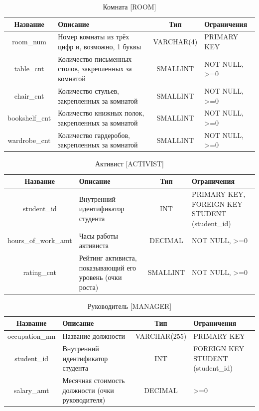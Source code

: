 \documentclass[a4paper,]{article}
\begin{document}
\begin{table}[H]
	\footnotesize
	\center
	\begin{tabular}[center]{|c|p{4.4cm}|c|p{2.5cm}|}
		\hline
		Название & Описание & Тип & Ограничения \\ \hline
		room\_num & Номер комнаты из трёх цифр и, возможно, 1 буквы & VARCHAR(4) & PRIMARY KEY \\ \hline
		table\_cnt & Количество письменных столов, закрепленных за комнатой & SMALLINT & NOT NULL, >=0 \\ \hline
		chair\_cnt & Количество стульев, закрепленных за комнатой & SMALLINT & NOT NULL, >=0 \\ \hline
		bookshelf\_cnt & Количество книжных полок, закрепленных за комнатой & SMALLINT & NOT NULL, >=0 \\ \hline
		wardrobe\_cnt & Количество гардеробов, закрепленных за комнатой & SMALLINT & NOT NULL, >=0 \\ \hline
	\end{tabular}
	\caption{Комната [ROOM]}
\end{table}

\begin{table}[H]
	\footnotesize
	\center
	\begin{tabular}[center]{|c|p{4cm}|c|p{3.3cm}|}
		\hline
		Название & Описание & Тип & Ограничения \\ \hline
		student\_id & Внутренний идентификатор студента & INT & PRIMARY KEY, FOREIGN KEY STUDENT (student\_id) \\ \hline
		hours\_of\_work\_amt & Часы работы активиста & DECIMAL & NOT NULL, >=0 \\ \hline
		rating\_cnt & Рейтинг активиста, показывающий его уровень (очки роста) & SMALLINT & NOT NULL, >=0 \\ \hline
	\end{tabular}
	\caption{Активист [ACTIVIST]}
\end{table}

\begin{table}[H]
	\footnotesize
	\center
	\begin{tabular}[center]{|c|p{4cm}|c|p{2.2cm}|}
		\hline
		Название & Описание & Тип & Ограничения \\ \hline
		occupation\_nm & Название должности & VARCHAR(255) & PRIMARY KEY \\ \hline
		student\_id & Внутренний идентификатор студента & INT & FOREIGN KEY STUDENT (student\_id) \\ \hline
		salary\_amt & Месячная стоимость должности (очки руководителя) & DECIMAL & >=0 \\ \hline
	\end{tabular}
	\caption{Руководитель [MANAGER]}
\end{table}
\end{document}
